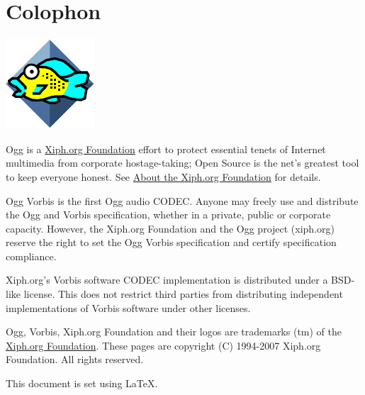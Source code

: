 \section*{Colophon}

\includegraphics{xifish} \label{footer}


Ogg is a \href{http://www.xiph.org/}{Xiph.org Foundation} effort
to protect essential tenets of Internet multimedia from corporate
hostage-taking; Open Source is the net's greatest tool to keep
everyone honest. See \href{http://www.xiph.org/about.html}{About
the Xiph.org Foundation} for details.


Ogg Vorbis is the first Ogg audio CODEC.  Anyone may freely use and
distribute the Ogg and Vorbis specification, whether in a private,
public or corporate capacity.  However, the Xiph.org Foundation and
the Ogg project (xiph.org) reserve the right to set the Ogg Vorbis
specification and certify specification compliance.

Xiph.org's Vorbis software CODEC implementation is distributed under a
BSD-like license.  This does not restrict third parties from
distributing independent implementations of Vorbis software under
other licenses.

Ogg, Vorbis, Xiph.org Foundation and their logos are trademarks (tm)
of the \href{http://www.xiph.org/}{Xiph.org Foundation}.  These
pages are copyright (C) 1994-2007 Xiph.org Foundation. All rights
reserved.

This document is set using \LaTeX.